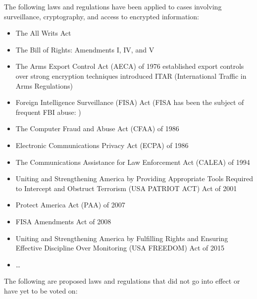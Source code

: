 The following laws and regulations have been applied to cases involving surveillance, cryptography, and access to
encrypted information:

\begin{itemize}
    \item The All Writs Act \cite{congress_1789}
    \item The Bill of Rights: Amendments I, IV, and V \cite{madison_1791}
    \item The Arms Export Control Act (AECA) of 1976 established export controls over strong encryption techniques
        introduced ITAR (International Traffic in Arms Regulations) \cite{morgan_hr13680_1976} \cite{kehl_right_2015}
    \item Foreign Intelligence Surveillance (FISA) Act \cite{rodino_1978}
        (FISA has been the subject of frequent FBI abuse: \cite{shamsi_2011} \cite{tucker_2020})
    \item The Computer Fraud and Abuse Act (CFAA) of 1986 \cite{hughes_hr4718_1986} \cite{wolff_computer_2016}
    \item Electronic Communications Privacy Act (ECPA) of 1986 \cite{kastenmeier_hr4952_1986}
    \item The Communications Assistance for Law Enforcement Act (CALEA) of 1994 \cite{edwards_hr4922_1994}
    \item Uniting and Strengthening America by Providing Appropriate Tools Required to Intercept and Obstruct Terrorism
        (USA PATRIOT ACT) Act of 2001 \cite{sensenbrenner_2001}
    \item Protect America Act (PAA) of 2007 \cite{mcconnell_s1927_2007}
    \item FISA Amendments Act of 2008 \cite{reyes_hr6304_2008}
    \item Uniting and Strengthening America by Fulfilling Rights and Ensuring Effective Discipline Over Monitoring
        (USA FREEDOM) Act of 2015 \cite{sensenbrenner_2015}
    \item \dots
\end{itemize}

The following are proposed laws and regulations that did not go into effect or have yet to be voted on:

